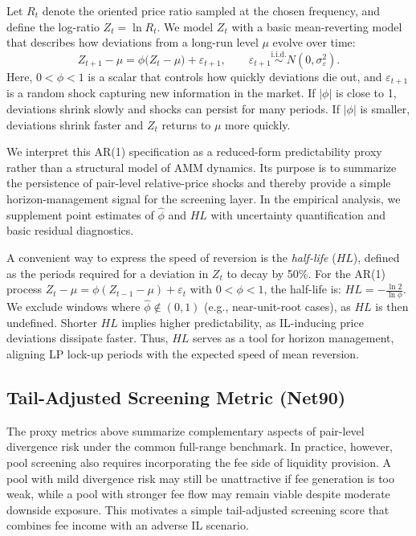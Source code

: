 \documentclass[anonymous]{lipics-v2021}
\begin{document}
Let \(R_t\) denote the oriented price ratio sampled at the chosen frequency, and define the log-ratio \(Z_t = \ln R_t\).
We model \(Z_t\) with a basic mean-reverting model that describes how deviations from a long-run level \(\mu\) evolve over time:
\begin{equation}
\label{eq:ar1_ratio}
Z_{t+1} - \mu = \phi \bigl(Z_t - \mu\bigr) + \varepsilon_{t+1}, 
\qquad \varepsilon_{t+1} \stackrel{\mathrm{i.i.d.}}{\sim} N(0, \sigma^2_\varepsilon).
\end{equation}
Here, $0<\phi<1$ is a scalar that controls how quickly deviations die out, and \(\varepsilon_{t+1}\) is a random shock capturing new information in the market.
If \(|\phi|\) is close to 1, deviations shrink slowly and shocks can persist for many periods.
If \(|\phi|\) is smaller, deviations shrink faster and \(Z_t\) returns to \(\mu\) more quickly.

{We interpret this AR(1) specification as a reduced-form predictability proxy rather than a structural model of AMM dynamics. Its purpose is to summarize the persistence of pair-level relative-price shocks and thereby provide a simple horizon-management signal for the screening layer. In the empirical analysis, we supplement point estimates of $\hat{\phi}$ and $HL$ with uncertainty quantification and basic residual diagnostics.}

A convenient way to express the speed of reversion is the \emph{half-life} ($HL$), defined as the periods required for a deviation in $Z_t$ to decay by 50\%. For the AR(1) process $Z_t-\mu = \phi(Z_{t-1}-\mu)+\varepsilon_t$ with $0<\phi<1$, the half-life is:
\(
    HL = -\frac{\ln 2}{\ln \phi}.
\)
We exclude windows where $\hat{\phi} \notin (0,1)$ (e.g., near-unit-root cases), as $HL$ is then undefined. Shorter $HL$ implies higher predictability, as IL-inducing price deviations dissipate faster. Thus, $HL$ serves as a tool for horizon management, aligning LP lock-up periods with the expected speed of mean reversion.

\subsection{Tail-Adjusted Screening Metric (Net90)}
\label{subsec:net90}

The proxy metrics above summarize complementary aspects of pair-level divergence risk under the common full-range benchmark. In practice, however, pool screening also requires incorporating the fee side of liquidity provision. A pool with mild divergence risk may still be unattractive if fee generation is too weak, while a pool with stronger fee flow may remain viable despite moderate downside exposure. This motivates a simple tail-adjusted screening score that combines fee income with an adverse IL scenario.
\end{document}
